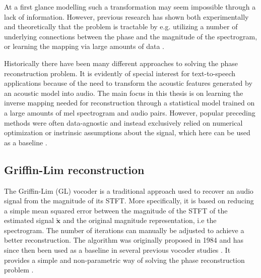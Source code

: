 \documentclass{report}
\begin{document}
At a first glance modelling such a transformation may seem impossible through a lack of information. However, previous research has shown both experimentally and theoretically that the problem is tractable by e.g. utilizing a number of underlying connections between the phase and the magnitude of the spectrogram, or learning the mapping via large amounts of data \cite{kawahara1999restructuring, agiomyrgiannakis2015vocaine, hayes1980signal, auger2012phase}.

Historically there have been many different approaches to solving the phase reconstruction problem. It is evidently of special interest for text-to-speech applications because of the need to transform the acoustic features generated by an acoustic model into audio. The main focus in this thesis is on learning the inverse mapping needed for reconstruction through a statistical model trained on a large amounts of mel spectrogram and audio pairs. However, popular preceding methods were often data-agnostic and instead exclusively relied on numerical optimization or instrinsic assumptions about the signal, which here can be used as a baseline \cite{toda2007voice, griffin1984signal}.


\subsection{Griffin-Lim reconstruction}

The Griffin-Lim (GL) vocoder is a traditional approach used to recover an audio signal from the magnitude of its STFT. More specifically, it is based on reducing a simple mean squared error between the magnitude of the STFT of the estimated signal $\tilde{\bm{x}}$ and the original magnitude representation, i.e the spectrogram. The number of iterations can manually be adjusted to achieve a better reconstruction. The algorithm was originally proposed in 1984 and has since then been used as a baseline in several previous vocoder studies \cite{wang2017tacotron, prenger2019waveglow}. It provides a simple and non-parametric way of solving the phase reconstruction problem \cite{griffin1984signal, albadawy2022vocbench}.
\end{document}
